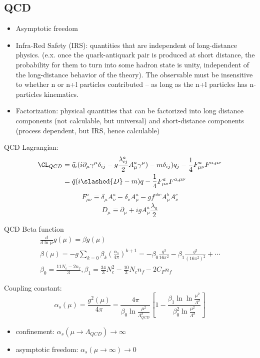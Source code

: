 \subsection{QCD}
\begin{itemize}
    \item Asymptotic freedom
    \item Infra-Red Safety (IRS): quantities that are independent of long-distance
	physics. (e.x. once the quark-antiquark pair is produced at short distance,
	the probability for them to turn into some hadron state is unity, 
	independent of the long-distance behavior of the theory). The observable
	must be insensitive to whether n or n+l particles contributed -- as long
	as the n+l particles has n-particles kinematics.
    \item Factorization: physical quantities that can be factorized into long
	distance components (not calculable, but universal) and short-distance
	components (process dependent, but IRS, hence calculable)
\end{itemize}
QCD Lagrangian:
\begin{equation*}
    \begin{aligned}
	\CL_{QCD} &= \bar{q}_i (i\partial_\mu \gamma^\mu \delta_{ij} -
	    g\frac{\lambda^a_{ij}}{2}A_\mu^a\gamma^\mu) - m\delta_{ij}) q_j 
	    - \frac{1}{4}F^a_{\mu\nu}F^{a, \mu\nu}    \\
		&= \bar{q}(i\slashed{D} - m)q - \frac{1}{4}F^a_{\mu\nu}F^{a, \mu\nu}
    \end{aligned}
\end{equation*}
$$ F^a_{\mu\nu} \equiv \delta_\mu A^a_\nu - \delta_\nu A^a_\mu - g f^{abc} A^b_\mu A^c_\nu $$
$$ D_\mu \equiv \partial_\mu + igA^a_\mu \frac{\lambda_a}{2} $$

QCD Beta function
\begin{gather*}
    \frac{d}{d\ln\mu} g(\mu) = \beta{g(\mu)}	\\
    \beta(\mu) = -g\sum_{k=0}\beta_k\left( \frac{\alpha_s}{4\pi}\right)^{k+1} = -\beta_0\frac{g^3}{16\pi^2} - \beta_1\frac{g^5}{(16\pi^2)^2} + \cdots	\\
    \beta_0 = \frac{11N_c - 2n_f}{3}, \beta_1 = \frac{34}{3}N_c^2 - \frac{10}{3}N_cn_f - 2C_F n_f
\end{gather*}

Coupling constant:
\begin{equation*}
    \alpha_s(\mu) = \frac{g^2(\mu)}{4\pi} = \frac{4\pi}{\beta_0\ln\frac{\mu^2}{\Lambda^2_{QCD}}}
    \left[ 1- \frac{\beta_1\ln\ln\frac{\mu^2}{\Lambda^2}}{\beta_0^2\ln\frac{\mu^2}{\Lambda^2}}\right]
\end{equation*}
\begin{itemize}
    \item confinement: $\alpha_s(\mu \rightarrow \Lambda_{QCD}) \rightarrow \infty$
    \item asymptotic freedom: $\alpha_s(\mu \rightarrow \infty) \rightarrow 0$
\end{itemize}

